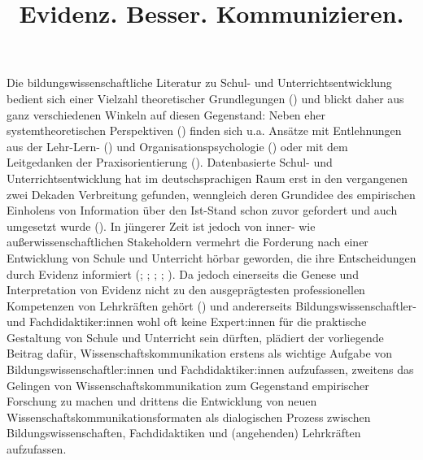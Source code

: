 \documentclass[
  jou,
  floatsintext,
  longtable,
  nolmodern,
  notxfonts,
  notimes,
  colorlinks=true,linkcolor=blue,citecolor=blue,urlcolor=blue]{apa7}
\title{Evidenz. Besser. Kommunizieren.}
\begin{document}
\maketitle


\setcounter{secnumdepth}{-\maxdimen} %

\setlength\LTleft{0pt}


Die bildungswissenschaftliche Literatur zu Schul- und
Unterrichtsentwicklung bedient sich einer Vielzahl theoretischer
Grundlegungen () und blickt daher aus
ganz verschiedenen Winkeln auf diesen Gegenstand: Neben eher
systemtheoretischen Perspektiven () finden sich u.a. Ansätze mit Entlehnungen aus der
Lehr-Lern- () und
Organisationspsychologie () oder mit dem Leitgedanken der Praxisorientierung
(). Datenbasierte Schul-
und Unterrichtsentwicklung hat im deutschsprachigen Raum erst in den
vergangenen zwei Dekaden Verbreitung gefunden, wenngleich deren
Grundidee des empirischen Einholens von Information über den Ist-Stand
schon zuvor gefordert und auch umgesetzt wurde
(). In jüngerer
Zeit ist jedoch von inner- wie außerwissenschaftlichen Stakeholdern
vermehrt die Forderung nach einer Entwicklung von Schule und Unterricht
hörbar geworden, die ihre Entscheidungen durch Evidenz informiert
(; ; ; ; ). Da jedoch einerseits
die Genese und Interpretation von Evidenz nicht zu den ausgeprägtesten
professionellen Kompetenzen von Lehrkräften gehört
() und andererseits
Bildungswissenschaftler- und Fachdidaktiker:innen wohl oft keine
Expert:innen für die praktische Gestaltung von Schule und Unterricht
sein dürften, plädiert der vorliegende Beitrag dafür,
Wissenschaftskommunikation erstens als wichtige Aufgabe von
Bildungswissenschaftler:innen und Fachdidaktiker:innen aufzufassen,
zweitens das Gelingen von Wissenschaftskommunikation zum Gegenstand
empirischer Forschung zu machen und drittens die Entwicklung von neuen
Wissenschaftskommunikationsformaten als dialogischen Prozess zwischen
Bildungswissenschaften, Fachdidaktiken und (angehenden) Lehrkräften
aufzufassen.
\end{document}
